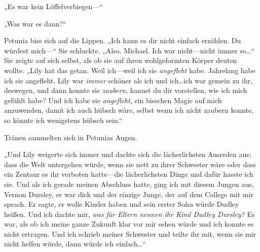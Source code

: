 „Es war kein Löffelverbiegen—“

„Was war es dann?“

Petunia biss sich auf die Lippen. „Ich kann es dir nicht einfach erzählen. Du würdest mich—“ Sie schluckte. „Also. Michael. Ich war nicht—nicht immer so…“ Sie zeigte auf sich selbst, als ob sie auf ihren wohlgeformten Körper deuten wollte. „Lily hat das getan. Weil ich—weil ich sie \emph{angefleht} habe. Jahrelang habe ich sie angefleht. Lily war \emph{immer} schöner als ich und ich…ich war gemein zu ihr, deswegen, und dann konnte sie \emph{zaubern}, kannst du dir vorstellen, wie ich mich gefühlt habe? Und ich habe sie \emph{angefleht}, ein bisschen Magie auf mich anzuwenden, damit ich auch hübsch wäre, selbst wenn ich nicht zaubern konnte, so könnte ich wenigstens hübsch sein.“

Tränen sammelten sich in Petunias Augen.

„Und Lily weigerte sich immer und dachte sich die lächerlichsten Ausreden aus; dass die Welt untergehen würde, wenn sie nett zu ihrer Schwester wäre oder dass ein Zentaur es ihr verboten hatte—die lächerlichsten Dinge und dafür hasste ich sie. Und als ich gerade meinen Abschluss hatte, ging ich mit diesem Jungen aus, Vernon Dursley, er war dick und der einzige Junge, der auf dem College mit mir sprach. Er sagte, er wolle Kinder haben und sein erster Sohn würde Dudley heißen. Und ich dachte mir, \emph{was für Eltern nennen ihr Kind Dudley Dursley?} Es war, als ob ich meine ganze Zukunft klar vor mir sehen würde und ich konnte es nicht ertragen. Und ich schrieb meiner Schwester und teilte ihr mit, wenn sie mir nicht helfen würde, dann würde ich einfach…“


